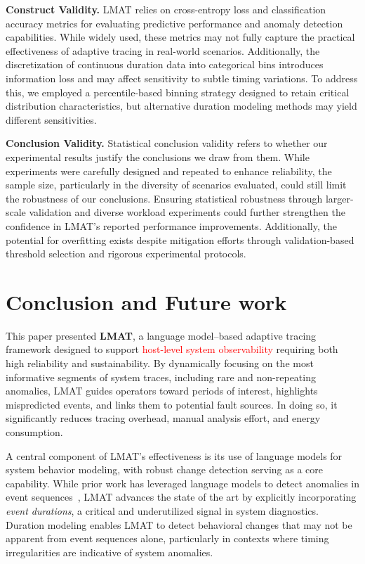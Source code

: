 \documentclass[preprint,12pt]{elsarticle}
\begin{document}
\textbf{Construct Validity.} LMAT relies on cross-entropy loss and classification accuracy metrics for evaluating predictive performance and anomaly detection capabilities. While widely used, these metrics may not fully capture the practical effectiveness of adaptive tracing in real-world scenarios. Additionally, the discretization of continuous duration data into categorical bins introduces information loss and may affect sensitivity to subtle timing variations. To address this, we employed a percentile-based binning strategy designed to retain critical distribution characteristics, but alternative duration modeling methods may yield different sensitivities.

\textbf{Conclusion Validity.} Statistical conclusion validity refers to whether our experimental results justify the conclusions we draw from them. While experiments were carefully designed and repeated to enhance reliability, the sample size, particularly in the diversity of scenarios evaluated, could still limit the robustness of our conclusions. Ensuring statistical robustness through larger-scale validation and diverse workload experiments could further strengthen the confidence in LMAT’s reported performance improvements. Additionally, the potential for overfitting exists despite mitigation efforts through validation-based threshold selection and rigorous experimental protocols.

\section{Conclusion and Future work} \label{conc}
This paper presented \textbf{LMAT}, a language model–based adaptive tracing framework designed to support \textcolor{red}{host-level system observability} requiring both high reliability and sustainability. By dynamically focusing on the most informative segments of system traces, including rare and non-repeating anomalies, LMAT guides operators toward periods of interest, highlights mispredicted events, and links them to potential fault sources. In doing so, it significantly reduces tracing overhead, manual analysis effort, and energy consumption.


A central component of LMAT’s effectiveness is its use of language models for system behavior modeling, with robust change detection serving as a core capability. While prior work has leveraged language models to detect anomalies in event sequences~\cite{fournier2021improving,fournier2023language}, LMAT advances the state of the art by explicitly incorporating \emph{event durations}, a critical and underutilized signal in system diagnostics. Duration modeling enables LMAT to detect behavioral changes that may not be apparent from event sequences alone, particularly in contexts where timing irregularities are indicative of system anomalies.
\end{document}
